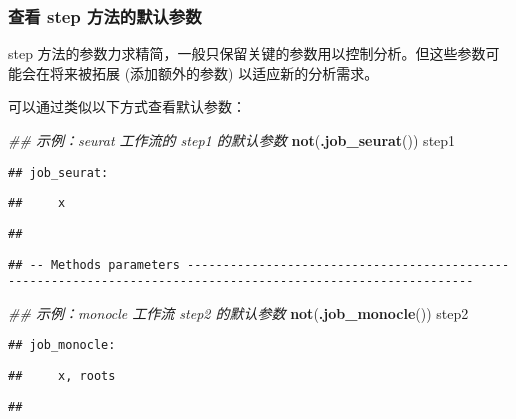 \documentclass[
]{article}
\newenvironment{Shaded}{\begin{snugshade}}{\end{snugshade}}
\newcommand{\CommentTok}[1]{\textcolor[rgb]{0.56,0.35,0.01}{\textit{#1}}}
\newcommand{\KeywordTok}[1]{\textcolor[rgb]{0.13,0.29,0.53}{\textbf{#1}}}
\newcommand{\NormalTok}[1]{#1}
\begin{document}
\hypertarget{params}{%
\subsubsection{查看 step 方法的默认参数}\label{params}}

step 方法的参数力求精简，一般只保留关键的参数用以控制分析。但这些参数可能会在将来被拓展 (添加额外的参数) 以适应新的分析需求。

可以通过类似以下方式查看默认参数：

\begin{Shaded}
\begin{Highlighting}[]
\CommentTok{\#\# 示例：seurat 工作流的 step1 的默认参数}
\KeywordTok{not}\NormalTok{(}\KeywordTok{.job\_seurat}\NormalTok{())}
\NormalTok{step1}
\end{Highlighting}
\end{Shaded}

\begin{verbatim}
## job_seurat:
\end{verbatim}

\begin{verbatim}
##     x
\end{verbatim}

\begin{verbatim}
## 
\end{verbatim}

\begin{verbatim}
## -- Methods parameters --------------------------------------------------------------------------------------------------------------
\end{verbatim}

\begin{Shaded}
\begin{Highlighting}[]
\CommentTok{\#\# 示例：monocle 工作流 step2 的默认参数}
\KeywordTok{not}\NormalTok{(}\KeywordTok{.job\_monocle}\NormalTok{())}
\NormalTok{step2}
\end{Highlighting}
\end{Shaded}

\begin{verbatim}
## job_monocle:
\end{verbatim}

\begin{verbatim}
##     x, roots
\end{verbatim}

\begin{verbatim}
## 
\end{verbatim}
\end{document}
